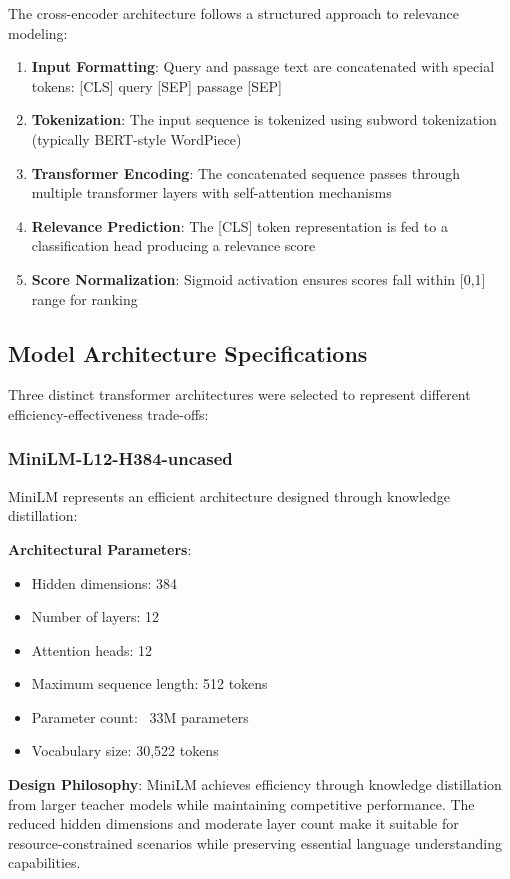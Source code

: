 The cross-encoder architecture follows a structured approach to relevance modeling:

\begin{enumerate}
    \item \textbf{Input Formatting}: Query and passage text are concatenated with special tokens: [CLS] query [SEP] passage [SEP]
    \item \textbf{Tokenization}: The input sequence is tokenized using subword tokenization (typically BERT-style WordPiece)
    \item \textbf{Transformer Encoding}: The concatenated sequence passes through multiple transformer layers with self-attention mechanisms
    \item \textbf{Relevance Prediction}: The [CLS] token representation is fed to a classification head producing a relevance score
    \item \textbf{Score Normalization}: Sigmoid activation ensures scores fall within [0,1] range for ranking
\end{enumerate}

\subsection{Model Architecture Specifications}

Three distinct transformer architectures were selected to represent different efficiency-effectiveness trade-offs:

\subsubsection{MiniLM-L12-H384-uncased}

MiniLM \cite{wang2020minilm} represents an efficient architecture designed through knowledge distillation:

\textbf{Architectural Parameters}:
\begin{itemize}
    \item Hidden dimensions: 384
    \item Number of layers: 12
    \item Attention heads: 12
    \item Maximum sequence length: 512 tokens
    \item Parameter count: ~33M parameters
    \item Vocabulary size: 30,522 tokens
\end{itemize}

\textbf{Design Philosophy}: MiniLM achieves efficiency through knowledge distillation from larger teacher models while maintaining competitive performance. The reduced hidden dimensions and moderate layer count make it suitable for resource-constrained scenarios while preserving essential language understanding capabilities.

